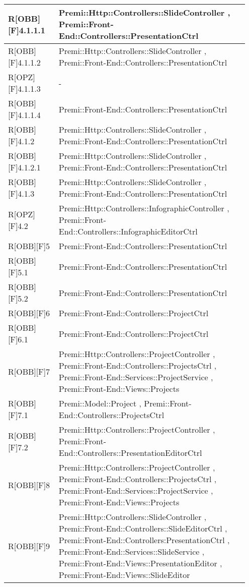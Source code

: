 \newpage
\begin{table}[h]
	\begin{center}
		\begin{tabular}{|p{0.2\linewidth}|p{0.75\linewidth}|}
			\toprule
			R[OBB][F]4.1.1.1 & Premi::Http::Controllers::SlideController , Premi::Front-End::Controllers::PresentationCtrl\\
		\midrule
			R[OBB][F]4.1.1.2 & Premi::Http::Controllers::SlideController , Premi::Front-End::Controllers::PresentationCtrl\\
		\midrule
			R[OPZ][F]4.1.1.3 & -\\
		\midrule
			R[OBB][F]4.1.1.4 & Premi::Front-End::Controllers::PresentationCtrl\\
		\midrule
			R[OBB][F]4.1.2 & Premi::Http::Controllers::SlideController , Premi::Front-End::Controllers::PresentationCtrl\\
		\midrule
			R[OBB][F]4.1.2.1 & Premi::Http::Controllers::SlideController , Premi::Front-End::Controllers::PresentationCtrl\\
		\midrule
			R[OBB][F]4.1.3 & Premi::Http::Controllers::SlideController , Premi::Front-End::Controllers::PresentationCtrl\\
		\midrule
			R[OPZ][F]4.2 & Premi::Http::Controllers::InfographicController , Premi::Front-End::Controllers::InfographicEditorCtrl\\
		\midrule
			R[OBB][F]5  & Premi::Front-End::Controllers::PresentationCtrl\\
		\midrule
			R[OBB][F]5.1 & Premi::Front-End::Controllers::PresentationCtrl\\
		\midrule
			R[OBB][F]5.2 & Premi::Front-End::Controllers::PresentationCtrl\\
		\midrule
			R[OBB][F]6 & Premi::Front-End::Controllers::ProjectCtrl \\
		\midrule
			R[OBB][F]6.1 & Premi::Front-End::Controllers::ProjectCtrl \\
		\midrule
			R[OBB][F]7 & Premi::Http::Controllers::ProjectController , Premi::Front-End::Controllers::ProjectsCtrl , Premi::Front-End::Services::ProjectService , Premi::Front-End::Views::Projects\\
		\midrule
			R[OBB][F]7.1 & Premi::Model::Project , Premi::Front-End::Controllers::ProjectsCtrl\\
		\midrule
			R[OBB][F]7.2 & Premi::Http::Controllers::ProjectController , Premi::Front-End::Controllers::PresentationEditorCtrl\\
		\midrule
			R[OBB][F]8 & Premi::Http::Controllers::ProjectController , Premi::Front-End::Controllers::ProjectsCtrl , Premi::Front-End::Services::ProjectService , Premi::Front-End::Views::Projects\\
		\midrule
			R[OBB][F]9 & Premi::Http::Controllers::SlideController , Premi::Front-End::Controllers::SlideEditorCtrl , Premi::Front-End::Controllers:PresentationCtrl , Premi::Front-End::Services::SlideService  , Premi::Front-End::Views::PresentationEditor , Premi::Front-End::Views::SlideEditor\\
		\bottomrule
		\end{tabular}
	\end{center}
\end{table}
	
